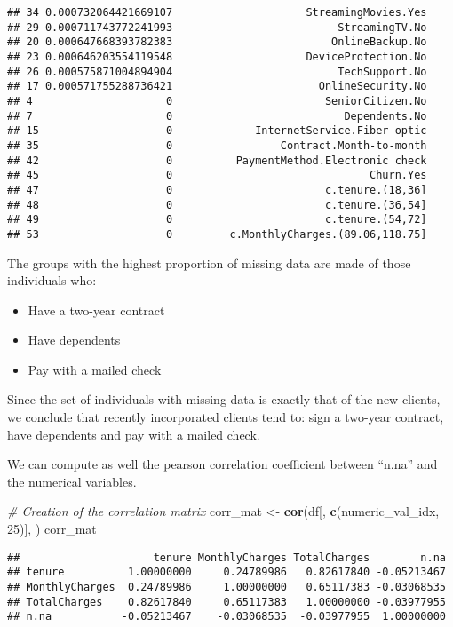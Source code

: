\documentclass[
]{article}
\newenvironment{Shaded}{\begin{snugshade}}{\end{snugshade}}
\newcommand{\CommentTok}[1]{\textcolor[rgb]{0.56,0.35,0.01}{\textit{#1}}}
\newcommand{\DecValTok}[1]{\textcolor[rgb]{0.00,0.00,0.81}{#1}}
\newcommand{\FunctionTok}[1]{\textcolor[rgb]{0.13,0.29,0.53}{\textbf{#1}}}
\newcommand{\NormalTok}[1]{#1}
\newcommand{\OtherTok}[1]{\textcolor[rgb]{0.56,0.35,0.01}{#1}}
\providecommand{\tightlist}{%
  \setlength{\itemsep}{0pt}\setlength{\parskip}{0pt}}
\begin{document}
\begin{verbatim}
## 34 0.000732064421669107                     StreamingMovies.Yes
## 29 0.000711743772241993                          StreamingTV.No
## 20 0.000647668393782383                         OnlineBackup.No
## 23 0.000646203554119548                     DeviceProtection.No
## 26 0.000575871004894904                          TechSupport.No
## 17 0.000571755288736421                       OnlineSecurity.No
## 4                     0                        SeniorCitizen.No
## 7                     0                           Dependents.No
## 15                    0             InternetService.Fiber optic
## 35                    0                 Contract.Month-to-month
## 42                    0          PaymentMethod.Electronic check
## 45                    0                               Churn.Yes
## 47                    0                        c.tenure.(18,36]
## 48                    0                        c.tenure.(36,54]
## 49                    0                        c.tenure.(54,72]
## 53                    0         c.MonthlyCharges.(89.06,118.75]
\end{verbatim}

The groups with the highest proportion of missing data are made of those
individuals who:

\begin{itemize}
\tightlist
\item
  Have a two-year contract
\item
  Have dependents
\item
  Pay with a mailed check
\end{itemize}

Since the set of individuals with missing data is exactly that of the
new clients, we conclude that recently incorporated clients tend to:
sign a two-year contract, have dependents and pay with a mailed check.

We can compute as well the pearson correlation coefficient between
``n.na'' and the numerical variables.

\begin{Shaded}
\begin{Highlighting}[]
\CommentTok{\# Creation of the correlation matrix}
\NormalTok{corr\_mat }\OtherTok{\textless{}{-}} \FunctionTok{cor}\NormalTok{(df[, }\FunctionTok{c}\NormalTok{(numeric\_val\_idx, }\DecValTok{25}\NormalTok{)], )}
\NormalTok{corr\_mat}
\end{Highlighting}
\end{Shaded}

\begin{verbatim}
##                     tenure MonthlyCharges TotalCharges        n.na
## tenure          1.00000000     0.24789986   0.82617840 -0.05213467
## MonthlyCharges  0.24789986     1.00000000   0.65117383 -0.03068535
## TotalCharges    0.82617840     0.65117383   1.00000000 -0.03977955
## n.na           -0.05213467    -0.03068535  -0.03977955  1.00000000
\end{verbatim}
\end{document}

